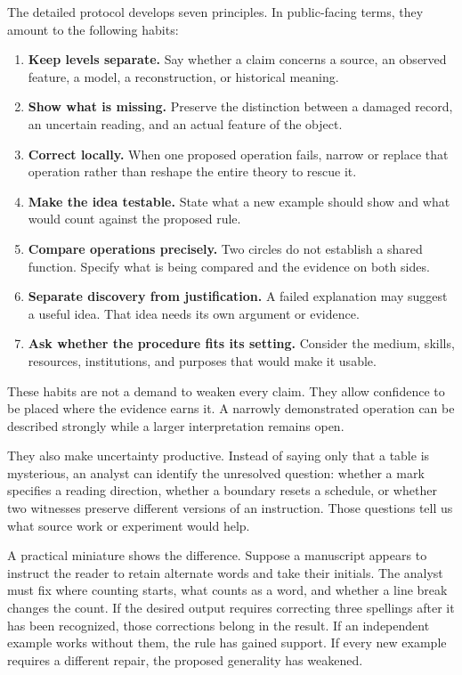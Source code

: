 \documentclass[11pt]{article}
\begin{document}
The detailed protocol develops seven principles.\cite{method} In public-facing
terms, they amount to the following habits:
\begin{enumerate}
\item \textbf{Keep levels separate.} Say whether a claim concerns a source,
an observed feature, a model, a reconstruction, or historical meaning.
\item \textbf{Show what is missing.} Preserve the distinction between a damaged
record, an uncertain reading, and an actual feature of the object.
\item \textbf{Correct locally.} When one proposed operation fails, narrow or
replace that operation rather than reshape the entire theory to rescue it.
\item \textbf{Make the idea testable.} State what a new example should show and
what would count against the proposed rule.
\item \textbf{Compare operations precisely.} Two circles do not establish a
shared function. Specify what is being compared and the evidence on both sides.
\item \textbf{Separate discovery from justification.} A failed explanation may
suggest a useful idea. That idea needs its own argument or evidence.
\item \textbf{Ask whether the procedure fits its setting.} Consider the medium,
skills, resources, institutions, and purposes that would make it usable.
\end{enumerate}

These habits are not a demand to weaken every claim. They allow confidence
to be placed where the evidence earns it. A narrowly demonstrated operation
can be described strongly while a larger interpretation remains open.

They also make uncertainty productive. Instead of saying only that a table
is mysterious, an analyst can identify the unresolved question: whether a
mark specifies a reading direction, whether a boundary resets a schedule,
or whether two witnesses preserve different versions of an instruction.
Those questions tell us what source work or experiment would help.

A practical miniature shows the difference. Suppose a manuscript appears to
instruct the reader to retain alternate words and take their initials.
The analyst must fix where counting starts, what counts as a word, and whether
a line break changes the count. If the desired output requires correcting
three spellings after it has been recognized, those corrections belong in
the result. If an independent example works without them, the rule has gained
support. If every new example requires a different repair, the proposed
generality has weakened.
\end{document}
